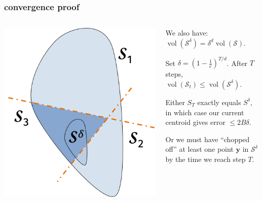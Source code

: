 \documentclass[compress]{beamer}
\newcommand{\bv}[1]{\mathbf{#1}}
\DeclareMathOperator{\vol}{vol}
\begin{document}
\begin{frame}
	\frametitle{convergence proof}
	\begin{columns}
		\begin{column}{.4\textwidth}
			\includegraphics[width=\textwidth]{cut_off.png}
		\end{column}
		\begin{column}{.6\textwidth}
			\vspace{.5em}
			
			We also have: $\vol(\mathcal{S}^\delta) = \delta^d \vol(\mathcal{S}).$
			
			\vspace{1em}
			Set $\delta = \left(1-\frac{1}{e}\right)^{T/d}$. After $T$ steps, $\vol(\mathcal{S}_t) \leq \vol(\mathcal{S}^\delta)$.  
			
			\vspace{1em}
			Either $S_T$ exactly equals $S^{\delta}$, in which case our current centroid gives error $\leq 2B\delta$.
			
			\vspace{1em} Or we must have ``chopped off'' at least one point $\bv{y}$ in $\mathcal{S}^\delta$ by the time we reach step $T$. 
			\vspace{1em}
			
		\end{column}
	\end{columns}
\end{frame}
\end{document}
